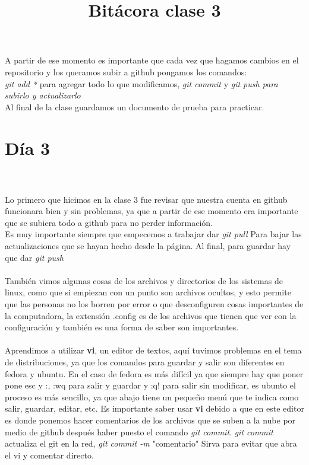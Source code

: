 \documentclass{book}
\begin{document}
	A partir de ese momento es importante que cada vez que hagamos cambios en el repositorio y los queramos subir a github pongamos los comandos:\\
	\textit{git add *} para agregar todo lo que modificamos,
	\textit{git commit} y \textit{git push para subirlo y actualizarlo}\\
	Al final de la clase guardamos un documento de prueba para practicar.
	
	\section{Día 3}
	\title{\Huge Bitácora clase 3} \\
	\\
	
	Lo primero que hicimos en la clase 3 fue revisar que nuestra cuenta en github funcionara bien y sin problemas, ya que a partir de ese momento era importante que se subiera todo a github para no perder información.\\
	Es muy importante siempre que empecemos a trabajar dar \textit{git pull} Para bajar las actualizaciones que se hayan hecho desde la página. Al final, para guardar hay que dar \textit{git push}\\
	\\
	También vimos algunas cosas de los archivos y directorios de los sistemas de linux, como que si empiezan con un punto son archivos ocultos, y esto permite que las personas no los borren por error o que desconfiguren cosas importantes de la computadora, la extensión .config es de los archivos que tienen que ver con la configuración y también es una forma de saber son importantes.\\
	\\
	Aprendimos a utilizar \textbf{vi}, un editor de textos, aquí tuvimos problemas en el tema de distribuciones, ya que los comandos para guardar y salir son diferentes en fedora y ubuntu. En el caso de fedora es más difícil ya que siempre hay que poner pone esc y :, :wq para salir y guardar y :q! para salir sin modificar, es ubunto el proceso es más sencillo, ya que abajo tiene un pequeño menú que te indica como salir, guardar, editar, etc. Es importante saber usar \textbf{vi} debido a que en este editor es donde ponemos hacer comentarios de los archivos que se suben a la nube por medio de github después haber puesto el comando \textit{git commit}. \textit{git commit} actualiza el git en la red, \textit{git commit -m} "comentario" Sirva para evitar que abra el vi y comentar directo.\\
\end{document}
